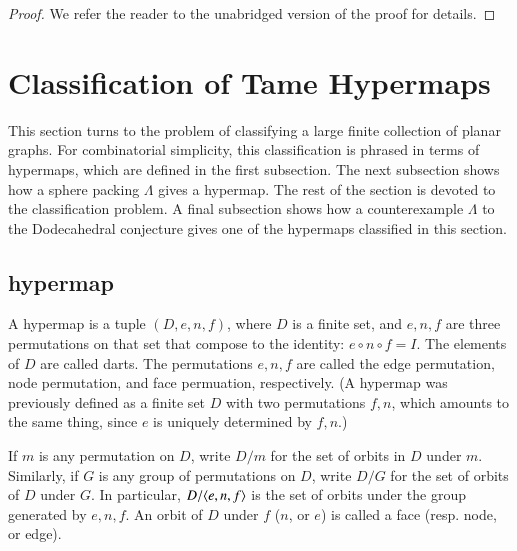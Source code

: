 \begin{proof}



We refer the reader to the unabridged version of the proof for details.
\end{proof}



\section{Classification of Tame Hypermaps}

This section turns to the problem of classifying a large finite collection
of planar graphs. For combinatorial simplicity, this classification is phrased
in terms of hypermaps, which are defined in the first subsection.
The next subsection shows how a sphere packing $\Lambda$ gives a hypermap.
The rest of the section is devoted to the classification problem.
A final subsection shows how a counterexample $\Lambda$ to the Dodecahedral
conjecture gives one of the hypermaps classified in this section.

\subsection{hypermap}

A hypermap is a tuple $(D,e,n,f)$, where $D$ is a finite
set, and $e,n,f$ are three permutations on that set that
compose to the identity:
$e\circ n\circ f = I$.  The elements of $D$ are called darts.
The permutations $e,n,f$ are called the edge permutation,
node permutation, and face permuation, respectively.
(A hypermap was previously defined as a finite set $D$ with
two permutations $f,n$, which amounts to the same thing,
since $e$ is uniquely determined by $f,n$.)

If $m$ is any permutation on $D$, write $D/m$ for the
set of orbits in $D$ under $m$.  Similarly, if $G$ is any
group of permutations on $D$, write $D/G$ for the set
of orbits of $D$ under $G$.  In particular, $D/\langle e,n,f\rangle$
is the set of orbits under the group generated by $e,n,f$.
An orbit of $D$ under $f$ ($n$, or $e$) is called a face (resp.
node, or edge).

